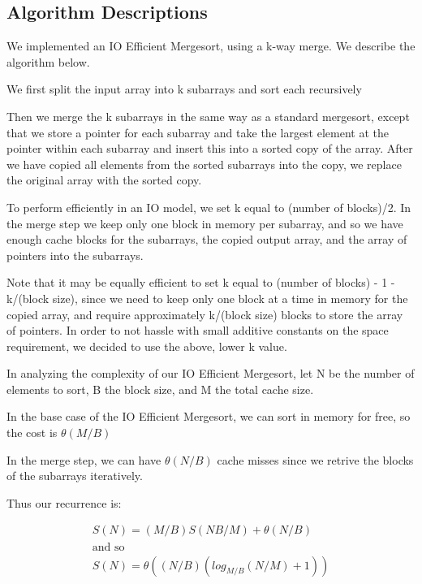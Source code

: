 \documentclass[11pt]{article}
\begin{document}
\subsection{Algorithm Descriptions}


We implemented an IO Efficient Mergesort, using a k-way merge. We describe the algorithm below.

We first split the input array into k subarrays and sort each recursively


Then we merge the k subarrays in the same way as a standard mergesort, except that we store a pointer for each subarray and take the largest element at the pointer within each subarray and insert this into a sorted copy of the array. After we have copied all elements from the sorted subarrays into the copy, we replace the original array with the sorted copy.

To perform efficiently in an IO model, we set k equal to (number of blocks)/2. In the merge step we keep only one block in memory per subarray, and so we have enough cache blocks for the subarrays, the copied output array, and the array of pointers into the subarrays. 

Note that it may be equally efficient to set k equal to (number of blocks) - 1 - k/(block size), since we need to keep only one block at a time in memory for the copied array, and require approximately k/(block size) blocks to store the array of pointers. In order to not hassle with small additive constants on the space requirement, we decided to use the above, lower k value.

In analyzing the complexity of our IO Efficient Mergesort, let N be the number of elements to sort, B the block size, and M the total cache size.

In the base case of the IO Efficient Mergesort, we can sort in memory for free, so the cost is $\theta(M/B)$

In the merge step, we can have $\theta(N/B)$ cache misses since we retrive the blocks of the subarrays iteratively.

Thus our recurrence is:

\begin{align*}
S(N) = (M/B)S(NB/M) + \theta(N/B) \\
\text{and so} \\
S(N) = \theta((N/B)(log_{M/B}(N/M) +1))
\end{align*}
\end{document}

